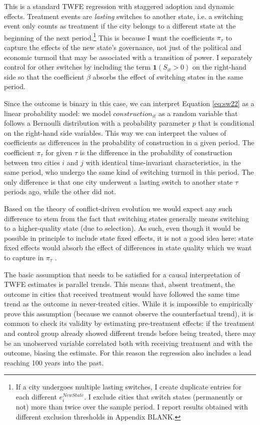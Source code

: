 \documentclass[11pt, a4paper]{article}
\begin{document}
This is a standard TWFE regression with staggered adoption and dynamic effects. Treatment events are \textit{lasting} switches to another state, i.e. a switching event only counts as treatment if the city belongs to a different state at the beginning of the next period.\footnote
{
    If a city undergoes multiple lasting switches, I create duplicate entries for each different $e^{NewState}_i$. I exclude cities that switch states (permanently or not) more than twice over the sample period. I report results obtained with different exclusion thresholds in Appendix BLANK.
}
This is because I want the coefficients $\pi_\tau$ to capture the effects of the new state's governance, not just of the political and economic turmoil that may be associated with a transition of power. I separately control for other switches by including the term $\mathbf{1}(S_{it} > 0)$ on the right-hand side so that the coefficient $\beta$ absorbs the effect of switching states in the same period.

Since the outcome is binary in this case, we can interpret Equation \eqref{eq:sw22} as a linear probability model: we model $construction_{it}$ as a random variable that follows a Bernoulli distribution with a probability parameter $p$ that is conditional on the right-hand side variables. This way we can interpret the values of coefficients as differences in the probability of construction in a given period. The coefficient $\pi_\tau$ for given $\tau$ is the difference in the probability of construction between two cities $i$ and $j$ with identical time-invariant characteristics, in the same period, who undergo the same kind of switching turmoil in this period. The only difference is that one city underwent a lasting switch to another state $\tau$ periods ago, while the other did not. 


Based on the theory of conflict-driven evolution we would expect any such difference to stem from the fact that switching states generally means switching to a higher-quality state (due to selection). As such, even though it would be possible in principle to include state fixed effects, it is not a good idea here: state fixed effects would absorb the effect of differences in state quality which we want to capture in $\pi_\tau$ \citep[p. 13]{schoenholzer2022}.

The basic assumption that needs to be satisfied for a causal interpretation of TWFE estimates is parallel trends. This means that, absent treatment, the outcome in cities that received treatment would have followed the same time trend as the outcome in never-treated cities. While it is impossible to empirically prove this assumption (because we cannot observe the counterfactual trend), it is common to check its validity by estimating pre-treatment effects: if the treatment and control group already showed different trends before being treated, there may be an unobserved variable correlated both with receiving treatment and with the outcome, biasing the estimate. For this reason the regression also includes a lead reaching 100 years into the past.
\end{document}
